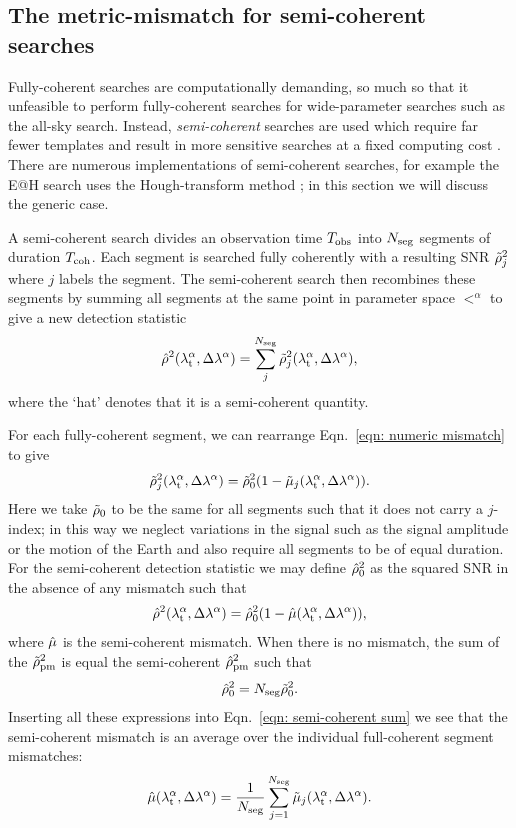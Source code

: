 \documentclass[../full_thesis/full_thesis.tex]{subfiles}
\begin{document}
\subsection{The metric-mismatch for semi-coherent searches}
\label{sec: the metric-mismatch approximation for semi-coherent searches}

Fully-coherent searches are computationally demanding, so much so that it
unfeasible to perform fully-coherent searches for wide-parameter searches
such as the all-sky search. Instead, \emph{semi-coherent}
searches are used which require far fewer templates and result in more
sensitive searches at a fixed computing cost \citep{Prix2009}. There are numerous
implementations of semi-coherent searches, for example the E@H search uses
the Hough-transform method \citep{Krishnan2004}; in this section we will discuss
the generic case.

A semi-coherent search divides an observation time $T_{\mathrm{obs}}$ into $N_{\textrm{seg}}$ segments of
duration $T_{\mathrm{coh}}$. Each segment is searched fully coherently with a resulting
SNR $\tilde{\rho}^{2}_{j}$ where $j$ labels the
segment. The semi-coherent search then recombines these segments by summing
all segments at the same point in parameter space $\lt^{\alpha}$ to give a new
detection statistic
\begin{align}
\hat{\rho}^{2}({\lambda}_\textrm{t}^{\alpha}, \Delta\lambda^{\alpha}) =
 \sum_{j}^{N_{\textrm{seg}}}\tilde{\rho}^{2}_{j}({\lambda}_\textrm{t}^{\alpha}, \Delta\lambda^{\alpha}),
\label{eqn: semi-coherent sum}
\end{align}
where the `hat' denotes that it is a semi-coherent quantity.

For each fully-coherent segment, we can rearrange Eqn.~\eqref{eqn: numeric mismatch}
to give
\begin{align}
\tilde{\rho}^{2}_{j}({\lambda}_\textrm{t}^{\alpha}, \Delta\lambda^{\alpha}) =
 \tilde{\rho}^{2}_{0}(1 - \tilde{\mu}_{j}({\lambda}_\textrm{t}^{\alpha}, \Delta\lambda^{\alpha})).
\end{align}
Here we take $\tilde{\rho}_{0}$ to be the same for all segments such that
it does not carry a $j$-index; in this way we neglect variations
in the signal such as the signal amplitude or the motion of the Earth and also require
all segments to be of equal duration.
For the semi-coherent
detection statistic we may define $\hat{\rho}^{2}_0$ as the squared SNR in the
absence of any mismatch such that
\begin{align}
\hat{\rho}^{2}({\lambda}_\textrm{t}^{\alpha}, \Delta\lambda^{\alpha}) =
 \hat{\rho}^{2}_0(1 - \hat{\mu}({\lambda}_\textrm{t}^{\alpha}, \Delta\lambda^{\alpha})),
\end{align}
where $\hat{\mu}$ is the semi-coherent mismatch.
When there is no mismatch, the sum of the $\tilde{\rho}^{2}_{\mathrm{pm}}$ is equal the
semi-coherent $\hat{\rho}^{2}_{\mathrm{pm}}$ such that
\begin{align}
\hat{\rho}^{2}_0 = N_{\textrm{seg}}\tilde{\rho}^{2}_0.
\end{align}
Inserting all these expressions into Eqn.~\eqref{eqn: semi-coherent sum} we see that
the semi-coherent mismatch is an average over the individual full-coherent segment
mismatches:
\begin{align}
\hat{\mu}({\lambda}_\textrm{t}^{\alpha}, \Delta\lambda^{\alpha}) =
 \frac{1}{N_{\textrm{seg}}}\sum_{j=1}^{N_{\textrm{seg}}}\tilde{\mu}_{j}({\lambda}_\textrm{t}^{\alpha}, \Delta\lambda^{\alpha}).
\label{eqn: semi-coherent mismatch}
\end{align}
\end{document}
